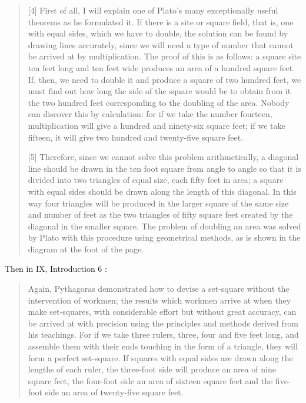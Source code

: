 \documentclass{article}
\theoremstyle{definition}
\begin{document}
\begin{quote}
[4] First of all, I will explain one of Plato's many exceptionally useful theorems as he formulated it. If there is a site
or square field, that is, one with equal sides, which we have to double, the solution can be found by drawing lines accurately,
since we will need a type of number that cannot be arrived at by multiplication. The proof of this is as follows: a square site
ten feet long and ten feet wide produces an area of a hundred square feet. If, then, we need to double it and produce a square
of two hundred feet, we must find out how long the side of the square would be to obtain from it the two hundred feet corresponding
to the doubling of the area. Nobody can discover this by calculation: for if we take the number fourteen, multiplication will give a 
hundred and ninety-six square feet; if we take fifteen, it will give two hundred and twenty-five square feet.

[5] Therefore, since we cannot solve this problem arithmetically, a diagonal line should be drawn in the ten foot square
from angle to angle so that it is divided into two triangles of equal size, each fifty feet in area; a square with equal sides
should be drawn along the length of this diagonal. In this way four triangles will be produced in the larger square of the same
size and number of feet as the two triangles of fifty square feet created by the diagonal in the smaller square. The problem of
doubling an area was solved by Plato with this procedure using geometrical methods, as is shown in the diagram at the foot
of the page.
\end{quote}

Then in IX, Introduction 6 \cite[pp.~243--244]{vitruvius}:

\begin{quote}
Again, Pythagoras demonstrated how to devise a set-square without the intervention of workmen; the results which workmen
arrive at when they make set-squares, with considerable effort but without great accuracy, can be arrived at with precision
using the principles and methods derived from his teachings. For if we take three rulers, three, four and five feet long,
and assemble them with their ends touching in the form of a triangle, they will form a perfect set-square. If squares with equal
sides are drawn along the lengths of each ruler, the three-foot side will produce an area of nine square feet, the four-foot
side an area of sixteen square feet and the five-foot side an area of twenty-five square feet.
\end{quote}
\end{document}
